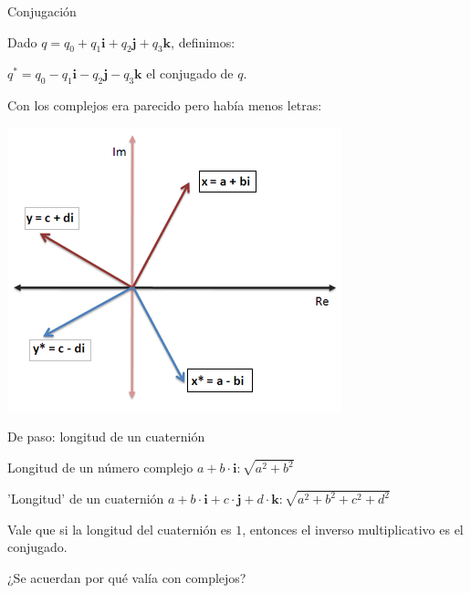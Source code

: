 \documentclass[10pt]{beamer}
\def\R{\mathbb{R}}
\def\ii{\textbf{i}}
\def\jj{\textbf{j}}
\def\kk{\textbf{k}}
\begin{document}
\begin{frame}{Conjugación}

Dado $q=q_0 + q_1 \textbf{i}+ q_2 \textbf{j}+ q_3 \textbf{k}$, definimos:

$q^* = q_0 -  q_1 \textbf{i} -  q_2 \textbf{j}-  q_3\textbf{k}$ el conjugado de $q$. \bigskip


Con los complejos era parecido pero había menos letras:

\includegraphics[scale=0.5]{conjugado.png}

\end{frame}


\begin{frame}{De paso: longitud de un cuaternión}
    
    Longitud de un número complejo $a+b\cdot \ii: \sqrt{a^2+b^2}$ \bigskip
    
    'Longitud' de un cuaternión $a+b\cdot \ii + c\cdot \jj + d\cdot \kk: \sqrt{a^2+b^2+c^2+d^2}$ 
    
    Vale que si la longitud del cuaternión es $1$, entonces el inverso multiplicativo es el conjugado.
    
    ¿Se acuerdan por qué valía con complejos?
\end{frame}
\end{document}
